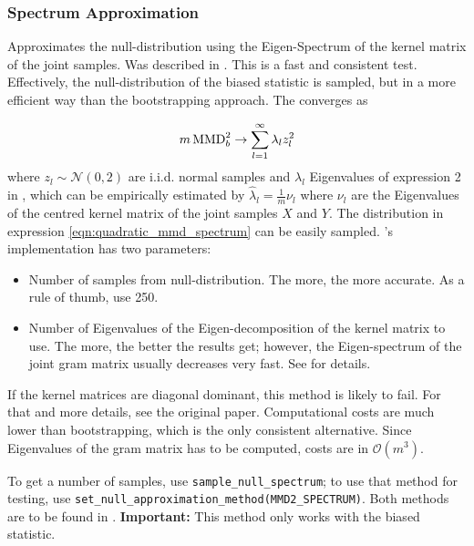 \subsubsection{Spectrum Approximation}
Approximates the null-distribution using the Eigen-Spectrum of the kernel matrix of the joint samples. Was described in \citep{Gretton2012b}. This is a fast and consistent test. Effectively, the null-distribution of the biased statistic is sampled, but in a more efficient way than the bootstrapping approach. The converges as

\begin{align}
\label{eqn:quadratic_mmd_spectrum}
m\operatorname{MMD}^2_b \rightarrow \sum_{l=1}^\infty \lambda_l z_l^2
\end{align}
where $z_l\sim \mathcal{N}(0,2)$ are i.i.d. normal samples and $\lambda_l$
Eigenvalues of expression 2 in \citep{Gretton2012b}, which can be empirically
estimated by $\hat\lambda_l=\frac{1}{m}\nu_l$ where $\nu_l$ are the Eigenvalues
of the centred kernel matrix of the joint samples $X$ and $Y$. The distribution
in expression \ref{eqn:quadratic_mmd_spectrum} can be easily sampled. \shogun{}'s implementation has two parameters:
\begin{itemize}
\item Number of samples from null-distribution. The more, the more accurate. As a rule of thumb, use 250.
\item Number of Eigenvalues of the Eigen-decomposition of the kernel matrix to use. The more, the better the results get; however, the Eigen-spectrum of the joint gram matrix usually decreases very fast. See \citep{Gretton2012b} for details.
\end{itemize}
If the kernel matrices are diagonal dominant, this method is likely to fail. For that and more details, see the original paper. Computational costs are much lower than bootstrapping, which is the only consistent alternative. Since Eigenvalues of the gram matrix has to be computed, costs are in $\mathcal{O}(m^3)$.

To get a number of samples, use \texttt{sample\_null\_spectrum}; to use that method for testing, use \texttt{set\_null\_approximation\_method(MMD2\_SPECTRUM)}. Both methods are to be found in . \textbf{Important:} This method only works with the biased statistic.

